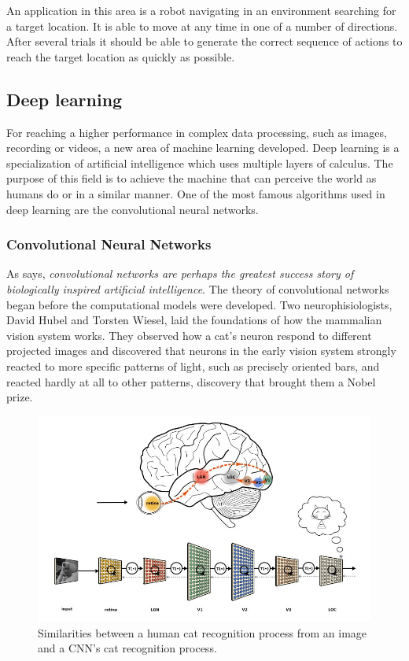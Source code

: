 \documentclass[runningheads,a4paper,12pt]{report}
\begin{document}
An application in this area is a robot navigating in an environment searching for a target location. It is able to move at any time in one of a number of directions. After several trials it should be able to generate the correct sequence of actions to reach the target location as quickly as possible.  

\subsection{Deep learning}
For reaching a higher performance in complex data processing, such as images, recording or videos, a new area of machine learning developed. Deep learning is a specialization of artificial intelligence which uses multiple layers of calculus. The purpose of this field is to achieve the machine that can perceive the world as humans do or in a similar manner. One of the most famous algorithms used in deep learning are the convolutional neural networks. 

\subsubsection*{Convolutional Neural Networks}
As \cite{deep-learning} says, \textit{convolutional networks are perhaps the greatest success story of biologically inspired artificial intelligence}. The theory of convolutional networks began before the computational models were developed. Two neurophisiologists, David Hubel and Torsten Wiesel, laid the foundations of how the mammalian vision system works. They observed how a cat's neuron respond to different projected images and discovered that neurons in the early vision system strongly reacted to more specific patterns of light, such as precisely oriented bars, and reacted hardly at all to other patterns, discovery that brought them a Nobel prize. 

\begin{figure}[h]
	\centering

  	\includegraphics[width=\linewidth]{./images/1_cnn_brain}\hfill

    \caption{Similarities between a human cat recognition process from an image and a CNN's cat recognition process.}  
    \label{fig:brain}
\end{figure} 
\end{document}
